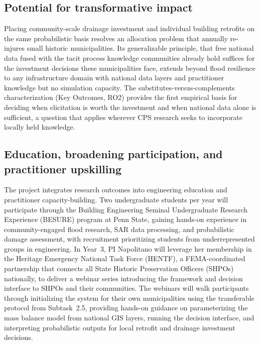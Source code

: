 \documentclass[11pt]{article}
\begin{document}
\subsection{Potential for transformative impact}
Placing community-scale drainage investment and individual building retrofits on
the same probabilistic basis resolves an allocation problem that annually
re-injures small historic municipalities.
Its generalizable principle, that free national data fused with the tacit process
knowledge communities already hold suffices for the investment decisions these
municipalities face, extends beyond flood resilience to any infrastructure domain
with national data layers and practitioner knowledge but no simulation capacity.
The substitutes-versus-complements characterization (Key Outcomes, RO2) provides
the first empirical basis for deciding when elicitation is worth the investment
and when national data alone is sufficient, a question that applies wherever
CPS research seeks to incorporate locally held knowledge.

\vspace{-10pt}
\subsection{Education, broadening participation, and practitioner upskilling}

The project integrates research outcomes into engineering education and practitioner
capacity-building.
Two undergraduate students per year will participate through the Building Engineering
Seminal Undergraduate Research Experience (BESURE) program at Penn State, gaining
hands-on experience in community-engaged flood research, SAR data processing, and
probabilistic damage assessment, with recruitment prioritizing students from
underrepresented groups in engineering.
In Year~3, PI Napolitano will leverage her membership in the Heritage Emergency
National Task Force (HENTF), a FEMA-coordinated partnership that connects all
State Historic Preservation Officers (SHPOs) nationally, to deliver a webinar series
introducing the framework and decision interface to SHPOs and their communities.
The webinars will walk participants through initializing the system for their own
municipalities using the transferable protocol from Subtask~2.5, providing hands-on
guidance on parameterizing the mass balance model from national GIS layers,
running the decision interface, and interpreting probabilistic outputs for local
retrofit and drainage investment decisions.
\end{document}
